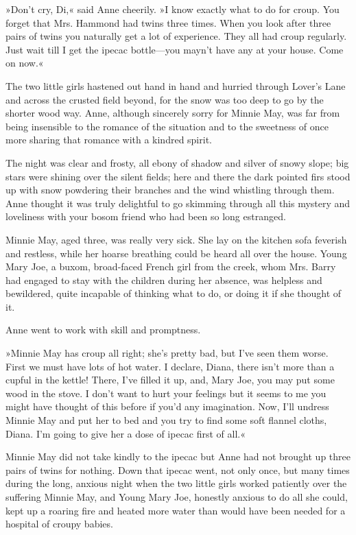 »Don’t cry, Di,« said Anne cheerily. »I know exactly what to do for croup. You forget that Mrs. Hammond had twins three times. When you look after three pairs of twins you naturally get a lot of experience. They all had croup regularly. Just wait till I get the ipecac bottle—you mayn’t have any at your house. Come on now.«

The two little girls hastened out hand in hand and hurried through Lover’s Lane and across the crusted field beyond, for the snow was too deep to go by the shorter wood way. Anne, although sincerely sorry for Minnie May, was far from being insensible to the romance of the situation and to the sweetness of once more sharing that romance with a kindred spirit.

The night was clear and frosty, all ebony of shadow and silver of snowy slope; big stars were shining over the silent fields; here and there the dark pointed firs stood up with snow powdering their branches and the wind whistling through them. Anne thought it was truly delightful to go skimming through all this mystery and loveliness with your bosom friend who had been so long estranged.

Minnie May, aged three, was really very sick. She lay on the kitchen sofa feverish and restless, while her hoarse breathing could be heard all over the house. Young Mary Joe, a buxom, broad-faced French girl from the creek, whom Mrs. Barry had engaged to stay with the children during her absence, was helpless and bewildered, quite incapable of thinking what to do, or doing it if she thought of it.

Anne went to work with skill and promptness.

»Minnie May has croup all right; she’s pretty bad, but I’ve seen them worse. First we must have lots of hot water. I declare, Diana, there isn’t more than a cupful in the kettle! There, I’ve filled it up, and, Mary Joe, you may put some wood in the stove. I don’t want to hurt your feelings but it seems to me you might have thought of this before if you’d any imagination. Now, I’ll undress Minnie May and put her to bed and you try to find some soft flannel cloths, Diana. I’m going to give her a dose of ipecac first of all.«

Minnie May did not take kindly to the ipecac but Anne had not brought up three pairs of twins for nothing. Down that ipecac went, not only once, but many times during the long, anxious night when the two little girls worked patiently over the suffering Minnie May, and Young Mary Joe, honestly anxious to do all she could, kept up a roaring fire and heated more water than would have been needed for a hospital of croupy babies.

